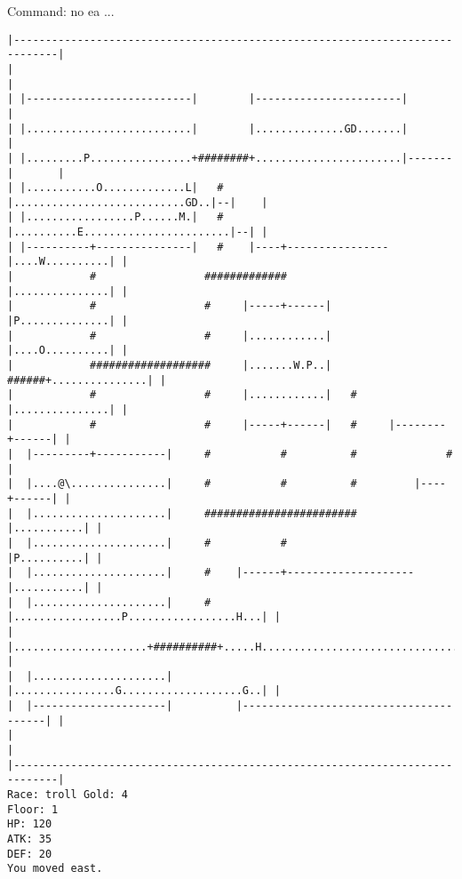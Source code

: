 \documentclass[11pt]{article}
\theoremstyle{plain}
\begin{document}
Command: no ea ...

\begin{Verbatim}[fontsize=\scriptsize]
|-----------------------------------------------------------------------------|
|                                                                             |
| |--------------------------|        |-----------------------|               |
| |..........................|        |..............GD.......|               |
| |.........P................+########+.......................|-------|       |
| |...........O.............L|   #    |...........................GD..|--|    |
| |.................P......M.|   #    |..........E.......................|--| |
| |----------+---------------|   #    |----+----------------|....W..........| |
|            #                 #############                |...............| |
|            #                 #     |-----+------|         |P..............| |
|            #                 #     |............|         |....O..........| |
|            ###################     |.......W.P..|   ######+...............| |
|            #                 #     |............|   #     |...............| |
|            #                 #     |-----+------|   #     |--------+------| |
|  |---------+-----------|     #           #          #              #        |
|  |....@\...............|     #           #          #         |----+------| |
|  |.....................|     ########################         |...........| |
|  |.....................|     #           #                    |P..........| |
|  |.....................|     #    |------+--------------------|...........| |
|  |.....................|     #    |.................P.................H...| |
|  |.....................+##########+.....H.................................| |
|  |.....................|          |................G...................G..| |
|  |---------------------|          |---------------------------------------| |
|                                                                             |
|-----------------------------------------------------------------------------|
Race: troll Gold: 4                                                    Floor: 1
HP: 120
ATK: 35
DEF: 20
You moved east. 
\end{Verbatim}
\end{document}
